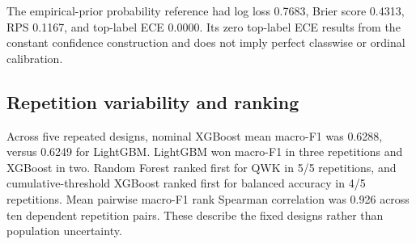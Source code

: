 \documentclass[information,article,submit,pdftex,moreauthors]{Definitions/mdpi}
\begin{document}
\begin{table}[H]
\centering\scriptsize
\caption{Selection-objective sensitivity for the four leading trained systems}
\label{tab:4}
\end{table}

The empirical-prior probability reference had log loss 0.7683, Brier score 0.4313, RPS 0.1167, and top-label ECE 0.0000. Its zero top-label ECE results from the constant confidence construction and does not imply perfect classwise or ordinal calibration.

\subsection{Repetition variability and ranking}

Across five repeated designs, nominal XGBoost mean macro-F1 was 0.6288, versus 0.6249 for LightGBM. LightGBM won macro-F1 in three repetitions and XGBoost in two. Random Forest ranked first for QWK in 5/5 repetitions, and cumulative-threshold XGBoost ranked first for balanced accuracy in 4/5 repetitions. Mean pairwise macro-F1 rank Spearman correlation was 0.926 across ten dependent repetition pairs. These describe the fixed designs rather than population uncertainty.
\end{document}
